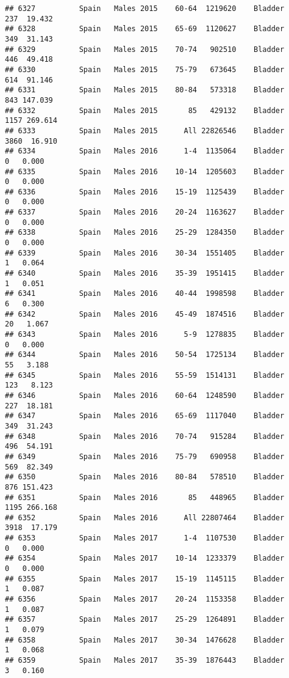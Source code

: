 \documentclass[
]{article}
\begin{document}
\begin{verbatim}
## 6327          Spain   Males 2015    60-64  1219620    Bladder    237  19.432
## 6328          Spain   Males 2015    65-69  1120627    Bladder    349  31.143
## 6329          Spain   Males 2015    70-74   902510    Bladder    446  49.418
## 6330          Spain   Males 2015    75-79   673645    Bladder    614  91.146
## 6331          Spain   Males 2015    80-84   573318    Bladder    843 147.039
## 6332          Spain   Males 2015       85   429132    Bladder   1157 269.614
## 6333          Spain   Males 2015      All 22826546    Bladder   3860  16.910
## 6334          Spain   Males 2016      1-4  1135064    Bladder      0   0.000
## 6335          Spain   Males 2016    10-14  1205603    Bladder      0   0.000
## 6336          Spain   Males 2016    15-19  1125439    Bladder      0   0.000
## 6337          Spain   Males 2016    20-24  1163627    Bladder      0   0.000
## 6338          Spain   Males 2016    25-29  1284350    Bladder      0   0.000
## 6339          Spain   Males 2016    30-34  1551405    Bladder      1   0.064
## 6340          Spain   Males 2016    35-39  1951415    Bladder      1   0.051
## 6341          Spain   Males 2016    40-44  1998598    Bladder      6   0.300
## 6342          Spain   Males 2016    45-49  1874516    Bladder     20   1.067
## 6343          Spain   Males 2016      5-9  1278835    Bladder      0   0.000
## 6344          Spain   Males 2016    50-54  1725134    Bladder     55   3.188
## 6345          Spain   Males 2016    55-59  1514131    Bladder    123   8.123
## 6346          Spain   Males 2016    60-64  1248590    Bladder    227  18.181
## 6347          Spain   Males 2016    65-69  1117040    Bladder    349  31.243
## 6348          Spain   Males 2016    70-74   915284    Bladder    496  54.191
## 6349          Spain   Males 2016    75-79   690958    Bladder    569  82.349
## 6350          Spain   Males 2016    80-84   578510    Bladder    876 151.423
## 6351          Spain   Males 2016       85   448965    Bladder   1195 266.168
## 6352          Spain   Males 2016      All 22807464    Bladder   3918  17.179
## 6353          Spain   Males 2017      1-4  1107530    Bladder      0   0.000
## 6354          Spain   Males 2017    10-14  1233379    Bladder      0   0.000
## 6355          Spain   Males 2017    15-19  1145115    Bladder      1   0.087
## 6356          Spain   Males 2017    20-24  1153358    Bladder      1   0.087
## 6357          Spain   Males 2017    25-29  1264891    Bladder      1   0.079
## 6358          Spain   Males 2017    30-34  1476628    Bladder      1   0.068
## 6359          Spain   Males 2017    35-39  1876443    Bladder      3   0.160

\end{verbatim}
\end{document}

